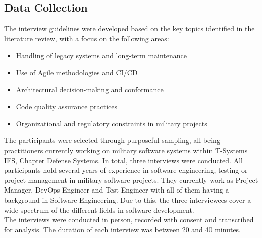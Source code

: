 \subsection{Data Collection}
The interview guidelines were developed based on the key topics identified in the literature review, with a focus on the following areas:
\begin{itemize}
    \item Handling of legacy systems and long-term maintenance
    \item Use of Agile methodologies and \ac{CI/CD}
    \item Architectural decision-making and conformance
    \item Code quality assurance practices
    \item Organizational and regulatory constraints in military projects
\end{itemize}
The participants were selected through purposeful sampling, all being practitioners currently working on military software systems within T-Systems IFS, Chapter Defense Systems. In total, three interviews were conducted. All participants hold several years of experience in software engineering, testing or project management
in military software projects. They currently work as Project Manager, DevOps Engineer and Test Engineer with all of them having a background in Software Engineering. Due to this, the three interviewees cover a wide spectrum of the different fields in software development.\\
The interviews were conducted in person, recorded with consent and transcribed for analysis. The duration of each interview was between 20 and 40 minutes.
